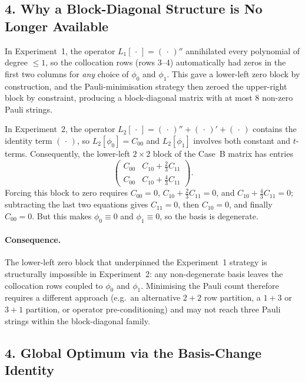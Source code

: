 \documentclass{article}
\begin{document}
\subsection*{4. Why a Block-Diagonal Structure is No Longer Available}

In Experiment~1, the operator $L_1[\,\cdot\,] = (\,\cdot\,)''$ annihilated every polynomial of degree
$\leq 1$, so the collocation rows (rows 3--4) automatically had zeros in the first two columns for
\emph{any} choice of $\phi_0$ and $\phi_1$.  This gave a lower-left zero block by construction,
and the Pauli-minimisation strategy then zeroed the upper-right block by constraint, producing a
block-diagonal matrix with at most 8 non-zero Pauli strings.

In Experiment~2, the operator $L_2[\,\cdot\,] = (\,\cdot\,)'' + (\,\cdot\,)' + (\,\cdot\,)$ contains
the identity term $(\,\cdot\,)$, so $L_2[\phi_0] = C_{00}$ and $L_2[\phi_1]$ involves both constant
and $t$-terms.  Consequently, the lower-left $2\times 2$ block of the Case~B matrix has entries
\begin{equation}
    \begin{pmatrix}
        C_{00} & C_{10} + \tfrac{2}{3}C_{11} \\
        C_{00} & C_{10} + \tfrac{4}{3}C_{11}
    \end{pmatrix}.
\end{equation}
Forcing this block to zero requires $C_{00} = 0$, $C_{10} + \tfrac{2}{3}C_{11} = 0$, and
$C_{10} + \tfrac{4}{3}C_{11} = 0$; subtracting the last two equations gives $C_{11} = 0$, then
$C_{10} = 0$, and finally $C_{00} = 0$.  But this makes $\phi_0 \equiv 0$ and $\phi_1 \equiv 0$,
so the basis is degenerate.

\paragraph{Consequence.}
The lower-left zero block that underpinned the Experiment~1 strategy is structurally
impossible in Experiment~2: any non-degenerate basis leaves the collocation rows coupled to
$\phi_0$ and $\phi_1$.  Minimising the Pauli count therefore requires a different approach
(e.g.\ an alternative $2+2$ row partition, a $1+3$ or $3+1$ partition, or operator
pre-conditioning) and may not reach three Pauli strings within the block-diagonal family.

\subsection*{4. Global Optimum via the Basis-Change Identity}
\end{document}
